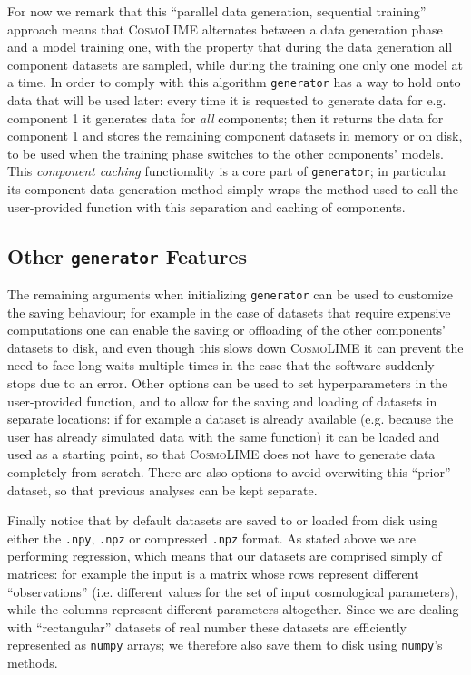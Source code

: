 For now we remark that this ``parallel data generation, sequential training'' approach means that \textsc{CosmoLIME} alternates between a data generation phase and a model training one, with the property that during the data generation all component datasets are sampled, while during the training one only one model at a time. In order to comply with this algorithm \texttt{generator} has a way to hold onto data that will be used later: every time it is requested to generate data for e.g. component 1 it generates data for \emph{all} components; then it returns the data for component 1 and stores the remaining component datasets in memory or on disk, to be used when the training phase switches to the other components' models. This \emph{component caching} functionality is a core part of \texttt{generator}; in particular its component data generation method simply wraps the method used to call the user-provided function with this separation and caching of components.

\subsection{Other \texttt{generator} Features}
The remaining arguments when initializing \texttt{generator} can be used to customize the saving behaviour; for example in the case of datasets that require expensive computations one can enable the saving or offloading of the other components' datasets to disk, and even though this slows down \textsc{CosmoLIME} it can prevent the need to face long waits multiple times in the case that the software suddenly stops due to an error. Other options can be used to set hyperparameters in the user-provided function, and to allow for the saving and loading of datasets in separate locations: if for example a dataset is already available (e.g. because the user has already simulated data with the same function) it can be loaded and used as a starting point, so that \textsc{CosmoLIME} does not have to generate data completely from scratch. There are also options to avoid overwiting this ``prior'' dataset, so that previous analyses can be kept separate.

Finally notice that by default datasets are saved to or loaded from disk using either the \texttt{.npy}, \texttt{.npz} or compressed \texttt{.npz} format. As stated above we are performing regression, which means that our datasets are comprised simply of matrices: for example the input is a matrix whose rows represent different ``observations'' (i.e. different values for the set of input cosmological parameters), while the columns represent different parameters altogether. Since we are dealing with ``rectangular'' datasets of real number these datasets are efficiently represented as \texttt{numpy} arrays; we therefore also save them to disk using \texttt{numpy}'s methods.


